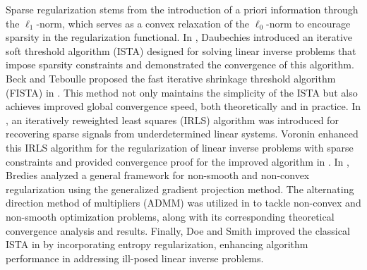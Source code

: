 \documentclass[a4paper,12pt]{article}
\numberwithin{equation}{section}
\begin{document}
\par Sparse regularization stems from the introduction of a priori information through the $\ell_{1}$-norm, which serves as a convex relaxation of the $\ell_{0}$-norm to encourage sparsity in the regularization functional. In \cite{DDD04}, Daubechies introduced an iterative soft threshold algorithm (ISTA) designed for solving linear inverse problems that impose sparsity constraints and demonstrated the convergence of this algorithm. Beck and Teboulle proposed the fast iterative shrinkage threshold algorithm (FISTA) in \cite{BT09}. This method not only maintains the simplicity of the ISTA but also achieves improved global convergence speed, both theoretically and in practice. In \cite{DDFG10}, an iteratively reweighted least squares (IRLS) algorithm was introduced for recovering sparse signals from underdetermined linear systems. Voronin enhanced this IRLS algorithm for the regularization of linear inverse problems with sparse constraints and provided convergence proof for the improved algorithm in \cite{VD15}. In \cite{BLR15}, Bredies analyzed a general framework for non-smooth and non-convex regularization using the generalized gradient projection method. The alternating direction method of multipliers (ADMM) was utilized in \cite{WYZ19} to tackle non-convex and non-smooth optimization problems, along with its corresponding theoretical convergence analysis and results. Finally, Doe and Smith improved the classical ISTA in \cite{DS24} by incorporating entropy regularization, enhancing algorithm performance in addressing ill-posed linear inverse problems.
\end{document}
